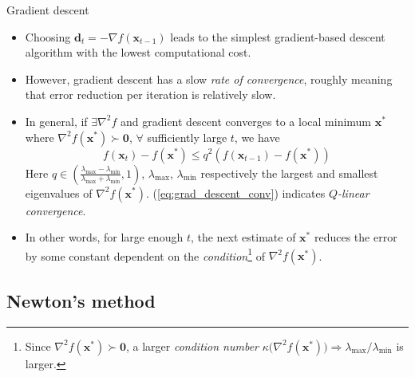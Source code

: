 \documentclass{beamer}
\numberwithin{equation}{section}
\newcommand{\aref}[1]{\alert{\ref{#1}}}
\begin{document}
\begin{frame}{Gradient descent}
    \begin{itemize}
        \item
        Choosing $ \mathbf{d}_t = -\nabla f(\mathbf{x}_{t - 1}) $ leads to the
        simplest gradient-based descent algorithm with the lowest computational
        cost.

        \item
        However, gradient descent has a slow \textit{rate of convergence},
        roughly meaning that error reduction per iteration is relatively slow.

        \item
        In general, if $ \exists \nabla^2f $ and gradient descent converges to
        a local minimum $ \mathbf{x}^* $ where $ \nabla^2f(\mathbf{x}^*) \succ
        \mathbf{0} $, $ \forall $ sufficiently large $ t $, we have
        \cite{nocedal_opt}
        \begin{equation} \label{eq:grad_descent_conv}
            f(\mathbf{x}_t) - f(\mathbf{x}^*) \le q^2(f(\mathbf{x}_{t - 1}) -
            f(\mathbf{x}^*))
        \end{equation}
        Here $ q \in \left(\frac{\lambda_{\max} -
        \lambda_{\min}}{\lambda_{\max} + \lambda_{\min}}, 1\right) $,
        $ \lambda_{\max} $, $ \lambda_{\min} $ respectively the largest and
        smallest eigenvalues of $ \nabla^2f(\mathbf{x}^*) $. 
        (\aref{eq:grad_descent_conv}) indicates
        $ Q $\textit{-linear convergence}.

        \item
        In other words, for large enough $ t $, the next estimate of
        $ \mathbf{x}^* $ reduces the error by some constant dependent on the
        \textit{condition}\footnote{
            Since $ \nabla^2f(\mathbf{x}^*) \succ \mathbf{0} $, a larger
            \textit{condition number} $ \kappa\big(\nabla^2f(\mathbf{x}^*)\big)
            \Rightarrow \lambda_{\max} / \lambda_{\min} $ is larger.
        } of $ \nabla^2 f(\mathbf{x}^*) $.
    \end{itemize}

    \medskip
\end{frame}

\subsection{Newton's method}
\end{document}
